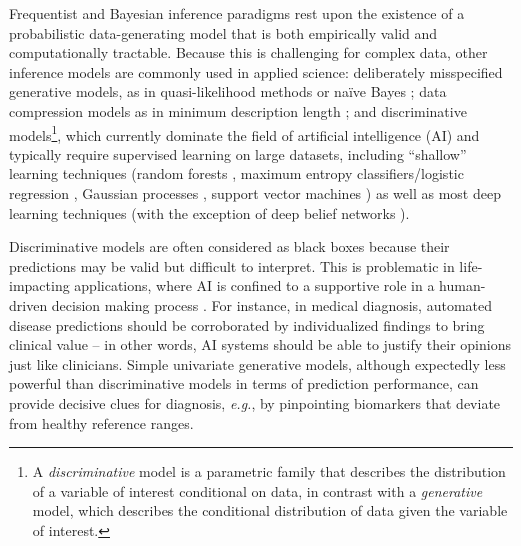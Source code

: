 \documentclass[english]{scrartcl}
\begin{document}
Frequentist and Bayesian inference paradigms rest upon the existence of a probabilistic data-generating model that is both empirically valid and computationally tractable. Because this is challenging for complex data, other inference models are commonly used in applied science: deliberately misspecified generative models, as in quasi-likelihood methods \cite{White-82,Walker-13} or na\"ive Bayes \cite{Ng-01}; data compression models as in minimum description length \cite{Grunwald-07}; and discriminative models\footnote{A {\em discriminative} model is a parametric family that describes the distribution of a variable of interest conditional on data, in contrast with a {\em generative} model, which describes the conditional distribution of data given the variable of interest.}, which currently dominate the field of artificial intelligence (AI) and typically require supervised learning on large datasets, including ``shallow'' learning techniques (random forests \cite{Ho-95}, maximum entropy classifiers/logistic regression \cite{BergerA-96}, Gaussian processes \cite{Rasmussen-06}, support vector machines \cite{Vapnik-00}) as well as most deep learning techniques \cite{Lecun-15,Goodfellow-16} (with the exception of deep belief networks \cite{Hinton-06}).


Discriminative models are often considered as black boxes because their predictions may be valid  but difficult to interpret. This is problematic in life-impacting applications, where AI is confined to a supportive role in a human-driven decision making process \cite{Molnar-18}. For instance, in medical diagnosis, automated disease predictions should be corroborated by individualized findings to bring clinical value -- in other words, AI systems should be able to justify their opinions just like clinicians. Simple univariate generative models, although expectedly less powerful than discriminative models in terms of prediction performance, can provide decisive clues for diagnosis, {\em e.g.}, by pinpointing biomarkers that deviate from healthy reference ranges.

\end{document}
